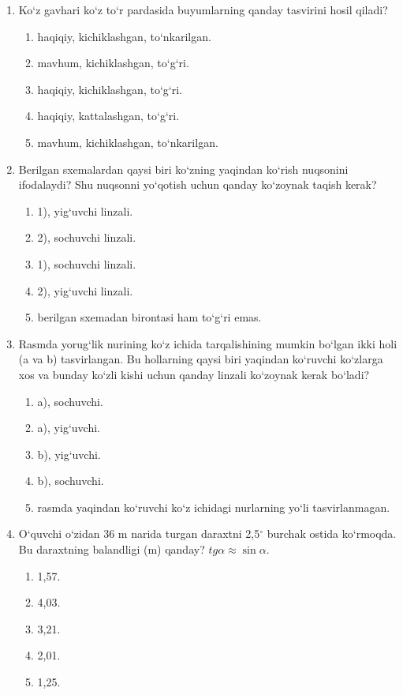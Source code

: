 \begin{enumerate}
\item Ko‘z gavhari ko‘z to‘r pardasida buyumlarning qanday tasvirini hosil qiladi?
\begin{enumerate}[label=\Alph*)]
\item haqiqiy, kichiklashgan, to‘nkarilgan.
\item mavhum, kichiklashgan, to‘g‘ri.
\item haqiqiy, kichiklashgan, to‘g‘ri.
\item haqiqiy, kattalashgan, to‘g‘ri.
\item mavhum, kichiklashgan, to‘nkarilgan.
\end{enumerate}



\item Berilgan sxemalardan qaysi biri ko‘zning yaqindan ko‘rish nuqsonini ifodalaydi? Shu nuqsonni yo‘qotish uchun qanday ko‘zoynak taqish kerak?
\begin{enumerate}[label=\Alph*)]
\item 1), yig‘uvchi linzali.
\item 2), sochuvchi linzali.
\item 1), sochuvchi linzali.
\item 2), yig‘uvchi linzali.
\item berilgan sxemadan birontasi ham to‘g‘ri emas.
\end{enumerate}

\item Rasmda yorug‘lik nurining ko‘z ichida tarqalishining mumkin bo‘lgan ikki holi (a va b) tasvirlangan. Bu hollarning qaysi biri yaqindan ko‘ruvchi ko‘zlarga xos va bunday ko‘zli kishi uchun qanday linzali ko‘zoynak kerak bo‘ladi?
\begin{enumerate}[label=\Alph*)]
\item a), sochuvchi.
\item a), yig‘uvchi.
\item b), yig‘uvchi.
\item b), sochuvchi.
\item rasmda yaqindan ko‘ruvchi ko‘z ichidagi nurlarning yo‘li tasvirlanmagan.
\end{enumerate}

\item O‘quvchi o‘zidan 36 m narida turgan daraxtni 2,5$^\circ$ burchak ostida ko‘rmoqda. Bu daraxtning balandligi (m) qanday?
$tg\alpha \approx \sin\alpha$.
\begin{enumerate}[label=\Alph*)]
\item 1,57.
\item 4,03.
\item 3,21.
\item 2,01.
\item 1,25.
\end{enumerate}


\end{enumerate}
